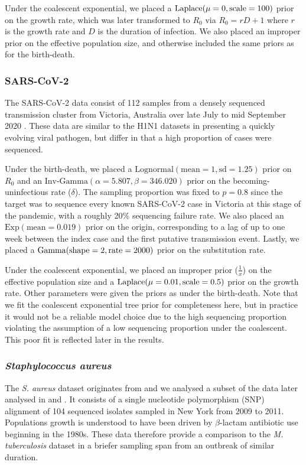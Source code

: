 \documentclass[12pt]{article}
\begin{document}
\begin{spacing}{2}
Under the coalescent exponential, we placed a $\textnormal{Laplace}(\mu=0,\textnormal{scale}=100)$ prior on the growth rate, which was later transformed to $R_0$ via $R_0 = rD+1$ where $r$ is the growth rate and $D$ is the duration of infection. We also placed an improper prior on the effective population size, and otherwise included the same priors as for the birth-death.

\subsubsection*{SARS-CoV-2}
The SARS-CoV-2 data consist of 112 samples from a densely sequenced transmission cluster from Victoria, Australia over late July to mid September 2020 \citet{lane2021genomics}. These data are similar to the H1N1 datasets in presenting a quickly evolving viral pathogen, but differ in that a high proportion of cases were sequenced.

Under the birth-death, we placed a $\textrm{Lognormal}(\textrm{mean}=1, \textrm{sd}=1.25)$ prior on $R_0$ and an $\textrm{Inv-Gamma}(\alpha=5.807, \beta=346.020)$ prior on the becoming-uninfectious rate ($\delta$). The sampling proportion was fixed to $p=0.8$ since the target was to sequence every known SARS-CoV-2 case in Victoria at this stage of the pandemic, with a roughly 20\% sequencing failure rate. We also placed an $\textrm{Exp}(\textrm{mean}=0.019)$ prior on the origin, corresponding to a lag of up to one week  between the index case and the first putative transmission event. Lastly, we placed a $\textnormal{Gamma}(\textnormal{shape}=2,\textnormal{rate}=2000)$ prior on the substitution rate.

Under the coalescent exponential, we placed an improper prior ($\frac{1}{x}$) on the effective population size and a $\textnormal{Laplace}(\mu=0.01,\textnormal{scale}=0.5)$ prior on the growth rate. Other parameters were given the priors as under the birth-death. Note that we fit the coalescent exponential tree prior for completeness here, but in practice it would not be a reliable model choice due to the high sequencing proportion violating the assumption of a low sequencing proportion under the coalescent. This poor fit is reflected later in the results.

\subsubsection*{\textit{Staphylococcus aureus}}
The \textit{S. aureus} dataset originates from \citet{uhlemann_molecular_2014} and we analysed a subset of the data later analysed in \citet{duchene_2016_genome} and \citet{volz_modeling_2018}. It consists of a single nucleotide polymorphism (SNP) alignment of 104 sequenced isolates sampled in New York from 2009 to 2011. Populations growth is understood to have been driven by $\beta$-lactam antibiotic use beginning in the 1980s. These data therefore provide a comparison to the \textit{M. tuberculosis} dataset in a briefer sampling span from an outbreak of similar duration.


\end{spacing}
\end{document}
